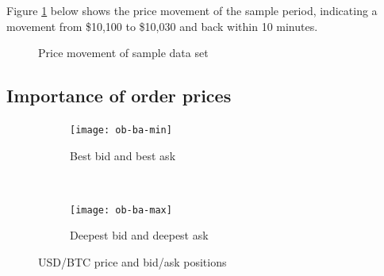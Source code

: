 Figure \ref{fig:data-price-movement} below shows the price movement of the sample period, indicating a movement from \$10,100 to \$10,030 and back within 10 minutes.

\begin{figure}[H]
    \centering
    \caption{Price movement of sample data set}
    \label{fig:data-price-movement}
\end{figure}

\subsection{Importance of order prices}
\label{sec:data-hypthesis-order-price}

\begin{figure}[H]
    \centering
    \begin{subfigure}[b]{0.45\textwidth}
        \texttt{[image: ob-ba-min]}
        \caption{Best bid and best ask}
        \label{fig:ob-ba-min}
    \end{subfigure}
    ~ %
    \begin{subfigure}[b]{0.45\textwidth}
        \texttt{[image: ob-ba-max]}
        \caption{Deepest bid and deepest ask}
        \label{fig:ob-ba-max}
    \end{subfigure}
    \caption{USD/BTC price and bid/ask positions}\label{fig:animals}
\end{figure}


